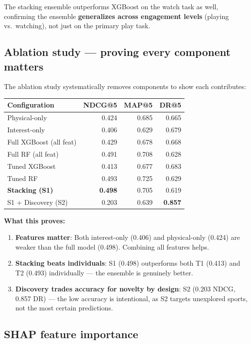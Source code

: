 \documentclass[12pt,a4paper]{article}
\begin{document}
The stacking ensemble outperforms XGBoost on the watch task as well,
confirming the ensemble \textbf{generalizes across engagement levels}
(playing vs.\ watching), not just on the primary play task.

\subsection{Ablation study --- proving every component matters}

The ablation study systematically removes components to show each contributes:

\begin{center}
\begin{tabular}{lrrr}
\toprule
\textbf{Configuration} & \textbf{NDCG@5} & \textbf{MAP@5} & \textbf{DR@5} \\
\midrule
Physical-only           & 0.424 & 0.685 & 0.665 \\
Interest-only           & 0.406 & 0.629 & 0.679 \\
Full XGBoost (all feat) & 0.429 & 0.678 & 0.668 \\
Full RF (all feat)      & 0.491 & 0.708 & 0.628 \\
Tuned XGBoost           & 0.413 & 0.677 & 0.683 \\
Tuned RF                & 0.493 & 0.725 & 0.629 \\
\textbf{Stacking (S1)}  & \textbf{0.498} & 0.705 & 0.619 \\
S1 + Discovery (S2)     & 0.203 & 0.639 & \textbf{0.857} \\
\bottomrule
\end{tabular}
\end{center}

\textbf{What this proves:}
\begin{enumerate}
\item \textbf{Features matter}: Both interest-only (0.406) and physical-only
(0.424) are weaker than the full model (0.498). Combining all features helps.
\item \textbf{Stacking beats individuals}: S1 (0.498) outperforms both T1
(0.413) and T2 (0.493) individually --- the ensemble is genuinely better.
\item \textbf{Discovery trades accuracy for novelty by design}: S2 (0.203
NDCG, 0.857 DR) --- the low accuracy is intentional, as S2 targets unexplored
sports, not the most certain predictions.
\end{enumerate}

\subsection{SHAP feature importance}
\end{document}
